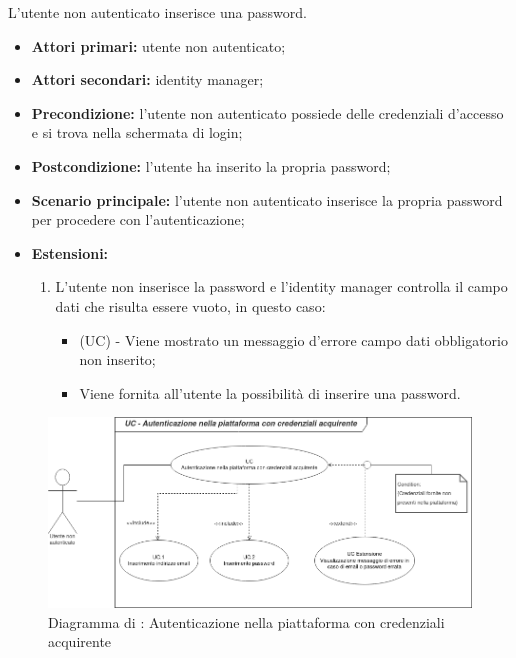 L'utente non autenticato inserisce una password.
\begin{itemize}
	\item \textbf{Attori primari:} utente non autenticato;
	\item \textbf{Attori secondari:} identity manager;
	\item \textbf{Precondizione:} l'utente non autenticato possiede delle credenziali d'accesso e si trova nella schermata di login;
	\item \textbf{Postcondizione:} l'utente ha inserito la propria password;
	\item \textbf{Scenario principale:} l'utente non autenticato inserisce la propria password per procedere con l'autenticazione;
	\item \textbf{Estensioni:} 
	\begin{enumerate}[label=(\alph*)]
		\item L'utente non inserisce la password e l'identity manager controlla il campo dati che risulta essere vuoto, in questo caso:
		\begin{itemize}
			\item (UC) - Viene mostrato un messaggio d'errore campo dati obbligatorio non inserito;
			\item Viene fornita all'utente la possibilità di inserire una password.
		\end{itemize}
	\end{enumerate}
\end{itemize}

\begin{figure}[H]
	\centering
	\includegraphics[scale=0.6]{Immagini/DiagrammiUC/AccessoAcquirente.png}
	\caption{Diagramma di \actualUC: Autenticazione nella piattaforma con credenziali acquirente} 
	\label{fig:LoginAcquirente}
\end{figure}

